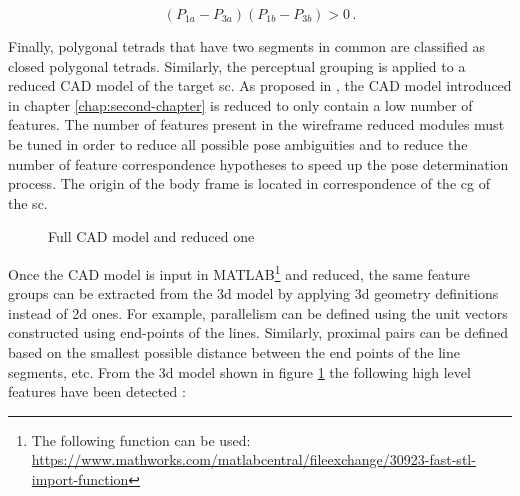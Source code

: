 \begin{equation}
  (P_{1a} - P_{3a})(P_{1b}-P_{3b}) > 0 \,.
\end{equation}

Finally, polygonal tetrads that have two segments in common are classified as closed polygonal tetrads.
Similarly, the perceptual grouping is applied to a reduced CAD model of the target \acrshort{sc}. As proposed in \cite{Sharma2018}, the CAD model introduced in chapter \ref{chap:second-chapter} is reduced to only contain a low number of features. The number of features present in the wireframe reduced modules must be tuned in order to reduce all possible pose ambiguities and to reduce the number of feature correspondence hypotheses to speed up the pose determination process. The origin of the body frame is located in correspondence of the \acrshort{cg} of the \acrshort{sc}.

\begin{figure}[htbp]
  \centering
  \qquad
  \qquad
  \caption{Full CAD model and reduced one}
  \label{fig:cadModel}
\end{figure}

Once the CAD model is input in MATLAB\footnote{The following function can be used: \url{https://www.mathworks.com/matlabcentral/fileexchange/30923-fast-stl-import-function}} and reduced, the same feature groups can be extracted from the \acrshort{3d} model by applying \acrshort{3d} geometry definitions instead of \acrshort{2d} ones. For example, parallelism can be defined using the unit vectors constructed using end-points of the lines. Similarly, proximal pairs can be defined based on the smallest possible distance between the end points of the line segments, etc.
From the \acrshort{3d} model shown in figure \ref{fig:cadModel} the following high level features have been detected :

